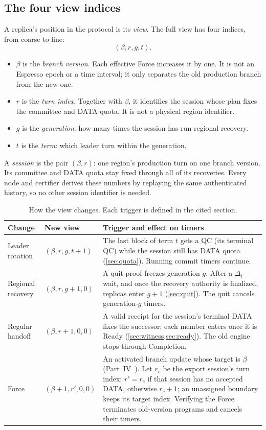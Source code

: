 \documentclass[11pt,a4paper]{article}
\newcommand{\defterm}[1]{\textcolor{rrBlue}{\textit{#1}}}
\newcounter{protocol}
\begin{document}
\subsection{The four view indices}
A replica's position in the protocol is its \emph{view}. The full view
has four indices, from coarse to fine:
\[
 (\beta,r,g,t).
\]
\begin{itemize}
\item $\beta$ is the \defterm{branch version}. Each effective Force
increases it by one. It is not an Espresso epoch or a time interval; it
only separates the old production branch from the new one.
\item $r$ is the \defterm{turn index}. Together with $\beta$, it identifies
the session whose plan fixes the committee and DATA quota.
It is not a physical region identifier.
\item $g$ is the \defterm{generation}: how many times the session has
run regional recovery.
\item $t$ is the \defterm{term}: which leader turn within the
generation.
\end{itemize}
A \defterm{session} is the pair $(\beta,r)$: one region's production
turn on one branch version. Its committee and DATA quota stay
fixed through all of its recoveries. Every node and certifier derives
these numbers by replaying the same authenticated history, so no other
session identifier is needed.

\begin{table}[htbp]\centering\small
\caption{How the view changes. Each trigger is defined in the cited
section.}\label{tab:views}
\begin{tabularx}{\linewidth}{@{}>{\raggedright\arraybackslash}p{.19\linewidth}>{\raggedright\arraybackslash}p{.25\linewidth}Y@{}}\toprule
Change & New view & Trigger and effect on timers\\\midrule
Leader rotation & $(\beta,r,g,t+1)$ & The last block of term $t$ gets a
QC (its terminal QC) while the session still has DATA quota
(\cref{sec:quota}). Running commit timers continue.\\
Regional recovery & $(\beta,r,g+1,0)$ & A quit proof freezes generation
$g$. After a $\Delta_i$ wait, and once the recovery authority is
finalized, replicas enter $g+1$ (\cref{sec:quit}). The quit cancels
generation-$g$ timers.\\
Regular handoff & $(\beta,r+1,0,0)$ & A valid receipt for the session's
terminal DATA fixes the successor; each member enters once it is Ready
(\cref{sec:witness,sec:ready}). The old engine stops through
Completion.\\
Force & $(\beta+1,r',0,0)$ & An activated branch update whose target is
$\beta$ (Part~IV~\cite{part4}). Let $r_c$ be the export session's turn index:
$r'=r_c$ if that session has no accepted DATA, otherwise $r_c+1$; an
unassigned boundary keeps its target index. Verifying the Force
terminates old-version programs and cancels their timers.\\
\bottomrule\end{tabularx}
\end{table}
\end{document}

